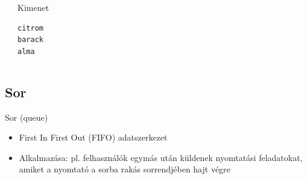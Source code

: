 \documentclass[usenames,dvipsnames,aspectratio=169]{beamer}
\begin{document}
\begin{frame}
  \begin{exampleblock}{}
    \vspace{-.2cm}
    
    \vspace{-.2cm}
  \end{exampleblock}
\end{frame}

\begin{frame}[fragile]
  \small
  \begin{columns}[c]
    \begin{exampleblock}{}
      \vspace{-.2cm}
      
      \vspace{-.2cm}
    \end{exampleblock}
    \begin{block}{Kimenet}
      \begin{verbatim}
citrom
barack
alma
\end{verbatim}
    \end{block}
  \end{columns}
\end{frame}

\subsection{Sor}
\begin{frame}
  Sor (queue)
  \begin{itemize}
    \item First In First Out (FIFO) adatszerkezet
    \item Alkalmazása: pl. felhasználók egymás után küldenek nyomtatási feladatokat, amiket a nyomtató a sorba rakás sorrendjében hajt végre
  \end{itemize}
  \footnotesize
  \begin{exampleblock}{}
    \vspace{-.3cm}
    
    \vspace{-.3cm}
  \end{exampleblock}
\end{frame}

\begin{frame}
  \scriptsize
  \begin{exampleblock}{}
    \vspace{-.3cm}
    
    \vspace{-.3cm}
  \end{exampleblock}
\end{frame}
\end{document}
